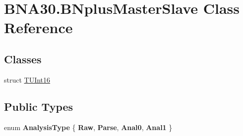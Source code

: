 \hypertarget{class_b_n_a30_1_1_b_nplus_master_slave}{}\section{B\+N\+A30.\+B\+Nplus\+Master\+Slave Class Reference}
\label{class_b_n_a30_1_1_b_nplus_master_slave}
\subsection*{Classes}
\begin{DoxyCompactItemize}
\item 
struct \mbox{\hyperlink{struct_b_n_a30_1_1_b_nplus_master_slave_1_1_t_u_int16}{T\+U\+Int16}}
\end{DoxyCompactItemize}
\subsection*{Public Types}
\begin{DoxyCompactItemize}
\item 
\mbox{\label{class_b_n_a30_1_1_b_nplus_master_slave_a5286a107da294e0dca0644bb377c28b5}} 
enum {\bfseries Analysis\+Type} \{ {\bfseries Raw}, 
{\bfseries Parse}, 
{\bfseries Anal0}, 
{\bfseries Anal1}
 \}
\end{DoxyCompactItemize}
